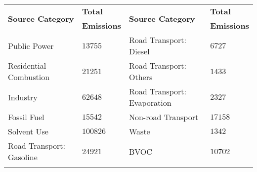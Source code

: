 \begin{tabular}{ll|ll}
    \hline \hline
    \multirow{2}{*}{\textbf{Source Category}} & \textbf{Total} & \multirow{2}{*}{\textbf{Source Category}} & \textbf{Total} \\ 
    & \textbf{Emissions} & & \textbf{Emissions} \\ \hline
    Public Power & $13755$ & Road Transport: Diesel & $6727$ \\
    Residential Combustion & $21251$ & Road Transport: Others & $1433$ \\
    Industry & $62648$ & Road Transport: Evaporation & $2327$ \\
    Fossil Fuel & $15542$ & Non-road Transport & $17158$ \\
    Solvent Use & $100826$ & Waste & $1342$ \\
    Road Transport: Gasoline & $24921$ & BVOC & $10702$ \\
    \hline \hline
    \label{t:NMVOC_emissions}%
\end{tabular}%
